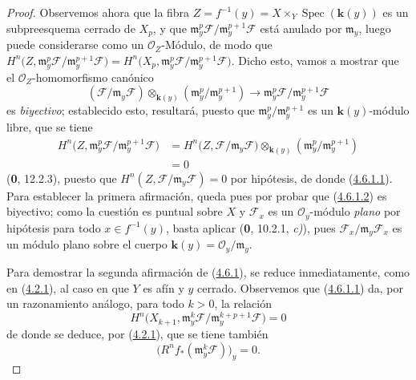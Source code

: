\documentclass[10pt,oneside,openany]{book}
\theoremstyle{egaenv}\newtheorem*{env}{---}
\theoremstyle{egastatement}
\theoremstyle{egadescription}
\newcommand{\oldpage}[2][]{\marginnote{\normalfont\scriptsize\textbf{#1}\,|\,#2}\ignorespaces}
\begin{document}
\begin{proof}
Observemos ahora que la fibra
$Z=f^{-1}(y)=X\times_Y\operatorname{Spec}(\boldsymbol{k}(y))$ es un subpreesquema cerrado
de $X_p$, y que
$\mathfrak m_y^p\mathcal F/\mathfrak m_y^{p+1}\mathcal F$ está anulado por
$\mathfrak m_y$, luego puede considerarse como un $\mathcal O_Z$-Módulo, de
modo que
$H^n\bigl(Z,\mathfrak m_y^p\mathcal F/
\mathfrak m_y^{p+1}\mathcal F\bigr)
=H^n\bigl(X_p,\mathfrak m_y^p\mathcal F/
\mathfrak m_y^{p+1}\mathcal F\bigr)$.
Dicho esto, vamos a mostrar que el $\mathcal O_Z$-homomorfismo canónico
\[
\label{III.4.6.1.2-fr}
(\mathcal F/\mathfrak m_y\mathcal F)
\otimes_{\mathbf{k}(y)}(\mathfrak m_y^p/\mathfrak m_y^{p+1})
\longrightarrow
\mathfrak m_y^p\mathcal F/\mathfrak m_y^{p+1}\mathcal F
\tag{4.6.1.2}
\]
es \emph{biyectivo}; establecido esto, resultará, puesto que
$\mathfrak m_y^p/\mathfrak m_y^{p+1}$ es un $\boldsymbol{k}(y)$-módulo libre, que se tiene
\[
\begin{split}
H^n\bigl(Z,\mathfrak m_y^p\mathcal F/
\mathfrak m_y^{p+1}\mathcal F\bigr)
&=H^n\bigl(Z,\mathcal F/\mathfrak m_y\mathcal F\bigr)
\otimes_{\mathbf{k}(y)}(\mathfrak m_y^p/\mathfrak m_y^{p+1})\\
&=0
\end{split}
\]
(\textbf{0}, 12.2.3), puesto que
$H^n(Z,\mathcal F/\mathfrak m_y\mathcal F)=0$ por hipótesis, de donde
(\hyperref[III.4.6.1.1-fr]{4.6.1.1}). Para establecer la primera afirmación,
queda pues por probar que (\hyperref[III.4.6.1.2-fr]{4.6.1.2}) es biyectivo;
como la cuestión es puntual sobre $X$ y $\mathcal F_x$ es un
$\mathcal O_y$-módulo \emph{plano} por hipótesis para todo $x\in f^{-1}(y)$,
basta aplicar (\textbf{0}, 10.2.1, \emph{c)}), pues
$\mathcal F_x/\mathfrak m_y\mathcal F_x$ es un módulo plano sobre el cuerpo
$\boldsymbol{k}(y)=\mathcal O_y/\mathfrak m_y$.

Para demostrar la segunda afirmación de (\hyperref[III.4.6.1-fr]{4.6.1}), se
reduce inmediatamente, como en (\hyperref[III.4.2.1-fr]{4.2.1}), al caso en que
$Y$ es afín y $y$ cerrado. Observemos que
(\hyperref[III.4.6.1.1-fr]{4.6.1.1}) da, por un razonamiento análogo,
para todo $k>0$, la relación
\[
\label{III.4.6.1.3-fr}
H^n\bigl(X_{k+1},
\mathfrak m_y^k\mathcal F/
\mathfrak m_y^{k+p+1}\mathcal F\bigr)=0
\tag{4.6.1.3}
\]
\oldpage[III]{141}
de donde se deduce, por (\hyperref[III.4.2.1-fr]{4.2.1}), que se tiene también
\[
\label{III.4.6.1.4-fr}
\bigl(R^nf_*(\mathfrak m_y^k\mathcal F)\bigr)_y=0.
\tag{4.6.1.4}
\]


\end{proof}
\end{document}
